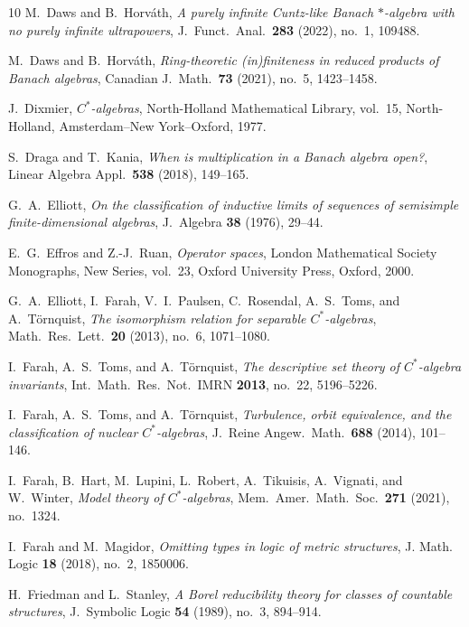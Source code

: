 \documentclass[12pt,fleqn,a4paper]{amsart}
\numberwithin{equation}{section}
\theoremstyle{definition}
\begin{document}
\begin{thebibliography}{10}
M.~Daws and B.~Horv{\'a}th,
\emph{A purely infinite Cuntz-like Banach $*$-algebra with no purely infinite ultrapowers},
J.\ Funct.\ Anal.\ \textbf{283} (2022), no.~1, 109488.

M.~Daws and B.~Horv{\'a}th,
\emph{Ring-theoretic (in)finiteness in reduced products of Banach algebras},
Canadian J.\ Math.\ \textbf{73} (2021), no.~5, 1423--1458.

J.~Dixmier,
\emph{$C^*$-algebras},
North-Holland Mathematical Library, vol.~15,
North-Holland, Amsterdam--New York--Oxford, 1977.

S.~Draga and T.~Kania,
\emph{When is multiplication in a Banach algebra open?},
Linear Algebra Appl.\ \textbf{538} (2018), 149--165.

G.~A.~Elliott,
\emph{On the classification of inductive limits of sequences of semisimple
finite-dimensional algebras},
J.~Algebra \textbf{38} (1976), 29--44.

E.~G.~Effros and Z.-J.~Ruan,
\emph{Operator spaces},
London Mathematical Society Monographs, New Series, vol.~23,
Oxford University Press, Oxford, 2000.

G.~A.~Elliott, I.~Farah, V.~I.~Paulsen, C.~Rosendal, A.~S.~Toms, and
A.~T{\"o}rnquist,
\emph{The isomorphism relation for separable $C^*$-algebras},
Math.~Res.~Lett.~\textbf{20} (2013), no.~6, 1071--1080.

I.~Farah, A.~S.~Toms, and A.~T{\"o}rnquist,
\emph{The descriptive set theory of $C^*$-algebra invariants},
Int.\ Math.\ Res.\ Not.\ IMRN \textbf{2013}, no.~22, 5196--5226.

I.~Farah, A.~S.~Toms, and A.~T{\"o}rnquist,
\emph{Turbulence, orbit equivalence, and the classification of nuclear $C^*$-algebras},
J.\ Reine Angew.\ Math.\ \textbf{688} (2014), 101--146.

I.~Farah, B.~Hart, M.~Lupini, L.~Robert, A.~Tikuisis, A.~Vignati, and
W.~Winter,
\emph{Model theory of $C^*$-algebras},
Mem.~Amer.~Math.~Soc.~\textbf{271} (2021), no.~1324.

I.~Farah and M.~Magidor,
\emph{Omitting types in logic of metric structures},
J. Math. Logic \textbf{18} (2018), no.~2, 1850006.

H.~Friedman and L.~Stanley,
\emph{A Borel reducibility theory for classes of countable structures},
J.\ Symbolic Logic \textbf{54} (1989), no.~3, 894--914.


\end{thebibliography}
\end{document}
